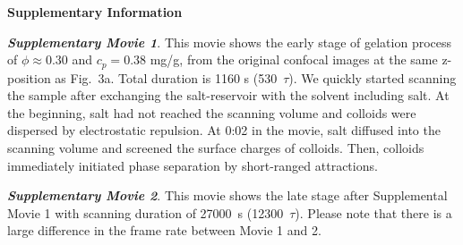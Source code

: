 \documentclass[12pt,onecolumn]{revtex4-1}
\begin{document}
\noindent
{\bf Supplementary Information}

\vspace{5mm}
\noindent
\emph{\bf Supplementary Movie 1}. This movie shows the early stage of gelation process of $\phi\approx 0.30$ and $c_p=0.38$ mg/g, from the original confocal images at the same z-position as Fig.~3a. Total duration is 1160 s (530~$\tau$). We quickly started scanning the sample after exchanging the salt-reservoir with the solvent including salt. At the beginning, salt had not reached the scanning volume and colloids were dispersed by electrostatic repulsion. At 0:02 in the movie, salt diffused into the scanning volume and screened the surface charges of colloids. Then, colloids immediately initiated phase separation by short-ranged attractions.

\vspace{5mm}
\noindent
\emph{\bf Supplementary Movie 2}.
This movie shows the late stage after Supplemental Movie 1 with scanning duration of 27000~s (12300~$\tau$). 
Please note that there is a large difference in the frame rate between Movie 1 and 2. 
\end{document}
